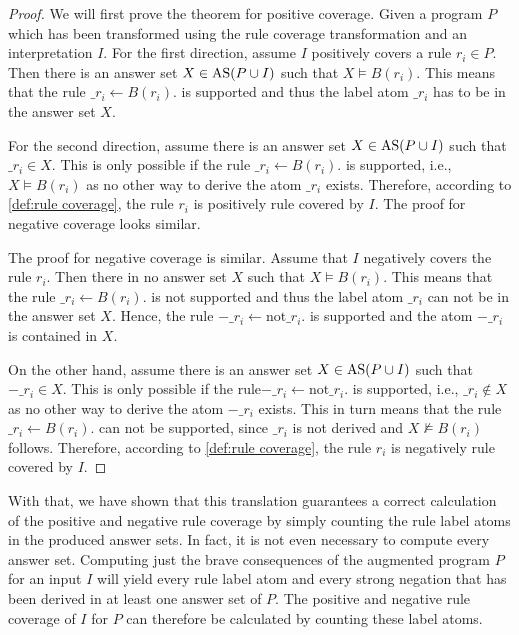 \begin{proof}
\label{pr:rule transformation}
    We will first prove the theorem for positive coverage.
    Given a program $P$ which has been transformed using the rule coverage transformation and an interpretation $I$. For the first direction, assume $I$ positively covers a rule \(r_i \in P\). Then there is an answer set \(X \in \operatorname{AS}(P \cup I)\) such that \(X \models B(r_i)\). This means that the rule \(\_r_i \leftarrow B(r_i).\) is supported and thus the label atom $\_r_i$ has to be in the answer set $X$. 
    
    For the second direction, assume there is an answer set \(X \in \operatorname{AS}(P \cup I)\) such that \(\_r_i \in X\). This is only possible if the rule \(\_r_i \leftarrow B(r_i).\) is supported, i.e., \(X \models B(r_i)\) as no other way to derive the atom $\_r_i$ exists. Therefore, according to \cref{def:rule coverage}, the rule $r_i$ is positively rule covered by $I$. The proof for negative coverage looks similar.

    The proof for negative coverage is similar.
    Assume that $I$ negatively covers the rule $r_i$. Then there in no answer set $X$ such that \(X \models B(r_i)\). This means that the rule \(\_r_i \leftarrow B(r_i).\) is not supported and thus the label atom $\_r_i$ can not be in the answer set $X$. Hence, the rule \(-\_r_i \leftarrow \text{not} \_r_i.\) is supported and the atom $-\_r_i$ is contained in $X$.

    On the other hand, assume there is an answer set \(X \in \operatorname{AS}(P \cup I)\) such that \(-\_r_i \in X\). This is only possible if the rule\(-\_r_i \leftarrow \text{not} \_r_i.\) is supported, i.e., \(\_r_i \not\in X\) as no other way to derive the atom $-\_r_i$ exists. This in turn means that the rule \(\_r_i \leftarrow B(r_i).\) can not be supported, since $\_r_i$ is not derived and \(X \not\models B(r_i)\) follows. Therefore, according to \cref{def:rule coverage}, the rule $r_i$ is negatively rule covered by $I$.
\end{proof}

With that, we have shown that this translation guarantees a correct calculation of the positive and negative rule coverage by simply counting the rule label atoms in the produced answer sets. In fact, it is not even necessary to compute every answer set. Computing just the brave consequences of the augmented program $P$ for an input $I$ will yield every rule label atom and every strong negation that has been derived in at least one answer set of $P$. The positive and negative rule coverage of $I$ for $P$ can therefore be calculated by counting these label atoms. 

